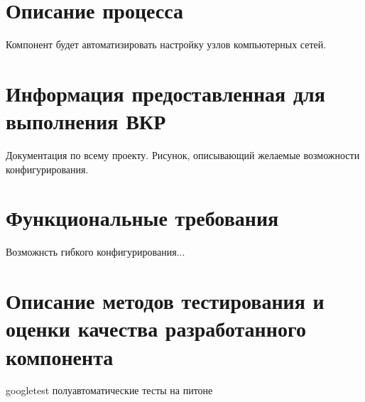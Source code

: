\documentclass[12pt]{article}
\begin{document}
\section{Описание процесса}
Компонент будет автоматизировать настройку узлов компьютерных сетей.

\section{Информация предоставленная для выполнения ВКР}
Документация по всему проекту.
Рисунок, описывающий желаемые возможности конфигурирования.

\section{Функциональные требования}
Возможнсть гибкого конфигурирования...


\section{Описание методов тестирования и оценки качества разработанного компонента}
googletest
полуавтоматические тесты на питоне

\end{document}
